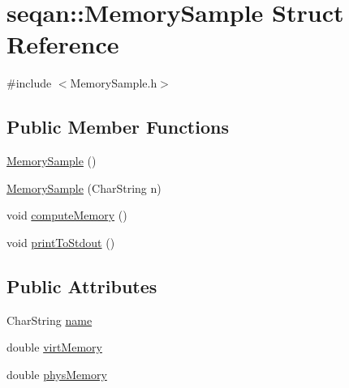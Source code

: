 \hypertarget{structseqan_1_1_memory_sample}{\section{seqan\-:\-:Memory\-Sample Struct Reference}
\label{structseqan_1_1_memory_sample}
}


{\ttfamily \#include $<$Memory\-Sample.\-h$>$}

\subsection*{Public Member Functions}
\begin{DoxyCompactItemize}
\item 
\hyperlink{structseqan_1_1_memory_sample_a404b8be3331ce456a00e782932d3fc1e}{Memory\-Sample} ()
\item 
\hyperlink{structseqan_1_1_memory_sample_ad9d482e58b6a39fd69b95dcba0826626}{Memory\-Sample} (Char\-String n)
\item 
void \hyperlink{structseqan_1_1_memory_sample_a7d0286090f1dc096cad63a5088feb26b}{compute\-Memory} ()
\item 
void \hyperlink{structseqan_1_1_memory_sample_a2f93fe0280338e4dad0c479ba3a3b778}{print\-To\-Stdout} ()
\end{DoxyCompactItemize}
\subsection*{Public Attributes}
\begin{DoxyCompactItemize}
\item 
Char\-String \hyperlink{structseqan_1_1_memory_sample_ac73b3a108cbef1afe887b007fd691b89}{name}
\item 
double \hyperlink{structseqan_1_1_memory_sample_a22b5eb5bbe60a5d9cb9b6cd6d2160412}{virt\-Memory}
\item 
double \hyperlink{structseqan_1_1_memory_sample_a9e83041889b177e0b3942e9b10492e4a}{phys\-Memory}
\end{DoxyCompactItemize}


